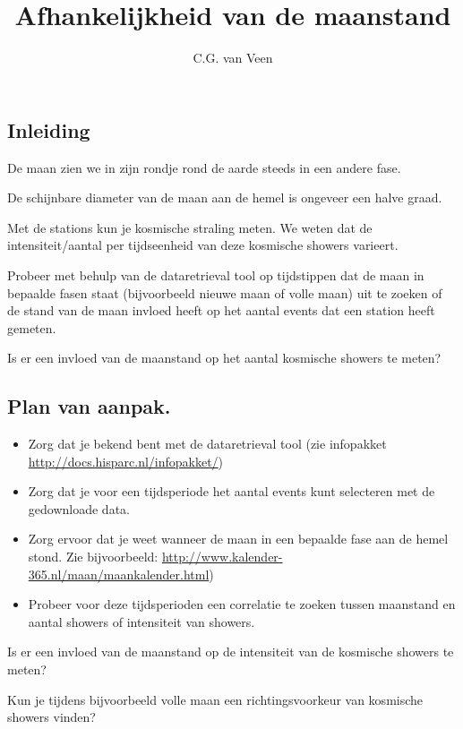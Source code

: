 


\title{Afhankelijkheid van de maanstand}
\author{C.G. van Veen}




\maketitle

\begin{questions}

\begin{EnvUplevel}
\section{Inleiding}

De maan zien we in zijn rondje rond de aarde steeds in een andere fase.

De schijnbare diameter van de maan aan de hemel is ongeveer een halve
graad.

Met de \hisparc stations kun je kosmische straling meten. We weten dat de
intensiteit/aantal per tijdseenheid van deze kosmische showers varieert.

Probeer met behulp van de dataretrieval tool op tijdstippen dat de maan in
bepaalde fasen staat (bijvoorbeeld nieuwe maan of volle maan) uit te
zoeken of de stand van de maan invloed heeft op het aantal events dat een
station heeft gemeten.
\end{EnvUplevel}

\question Is er een invloed van de maanstand op het aantal kosmische
showers te meten?

\begin{EnvUplevel}
\section{Plan van aanpak.}

\begin{itemize}
\item Zorg dat je bekend bent met de dataretrieval tool (zie
  infopakket \url{http://docs.hisparc.nl/infopakket/})
\item Zorg dat je voor een tijdsperiode het aantal events kunt
  selecteren met de gedownloade data.
\item Zorg ervoor dat je weet wanneer de maan in een bepaalde fase aan
  de hemel stond. Zie bijvoorbeeld:
  \url{http://www.kalender-365.nl/maan/maankalender.html})
\item Probeer voor deze tijdsperioden een correlatie te zoeken tussen
  maanstand en aantal showers of intensiteit van showers.
\end{itemize}
\end{EnvUplevel}



\question Is er een invloed van de maanstand op de intensiteit van de
kosmische showers te meten?

\question Kun je tijdens bijvoorbeeld volle maan een richtingsvoorkeur van
kosmische showers vinden?


\end{questions}


